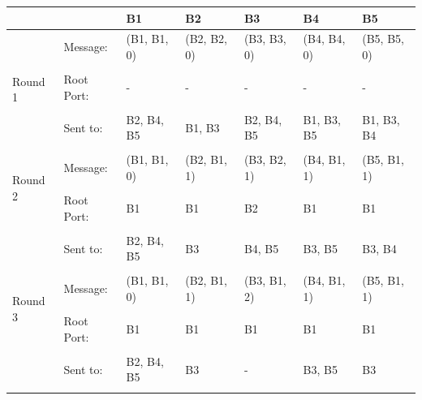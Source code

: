 \documentclass[10pt]{article}
\newenvironment{problem}[2][Problem]{\begin{trivlist}
\item[\hskip \labelsep {\bfseries #1}\hskip \labelsep {\bfseries #2.}]}{\end{trivlist}}
\begin{document}
\begin{problem} {1: Spanning Tree Protocol}
\begin{table}[ht]
\begin{center}
\begin{tabular}{|p{1.2cm}|p{2cm}|p{2.2cm}|p{2.2cm}|p{2.2cm}|p{2.2cm}|p{2.2cm}|}
	\hline
	& & B1 & B2 & B3 & B4 & B5\\
	\hline
	\multirow{6}{*}{Round 1}&Message:  & (B1, B1, 0)& (B2, B2, 0) & (B3, B3, 0) & (B4, B4, 0) & (B5, B5, 0)\\
	& & & & & &\\
	& Root Port: & -& -& -& -& -\\
	& & & & & &\\
	& Sent to: & B2, B4, B5& B1, B3& B2, B4, B5& B1, B3, B5& B1, B3, B4\\
	& & & & & &\\
	\hline
    \multirow{3}{*}{Round 2}&Message: & (B1, B1, 0)& (B2, B1, 1) & (B3, B2, 1) & (B4, B1, 1) & (B5, B1, 1)\\
	& & & & & &\\
	& Root Port: & B1 & B1 & B2 & B1 & B1\\
	& & & & & &\\
	& Sent to: & B2, B4, B5 & B3 & B4, B5 & B3, B5 & B3, B4\\
	& & & & & &\\
	\hline
    \multirow{3}{*}{Round 3}&Message: & (B1, B1, 0) & (B2, B1, 1) & (B3, B1, 2) & (B4, B1, 1) & (B5, B1, 1)\\
	& & & & & &\\
	& Root Port: & B1& B1 & B1 & B1 & B1\\
	& & & & & &\\
	& Sent to: & B2, B4, B5 & B3 & - & B3, B5 & B3\\
	& & & & & &\\
	\hline
    
\end{tabular}
\end{center}
\label{tab:multicol}
\end{table}
\end{problem}
\end{document}
